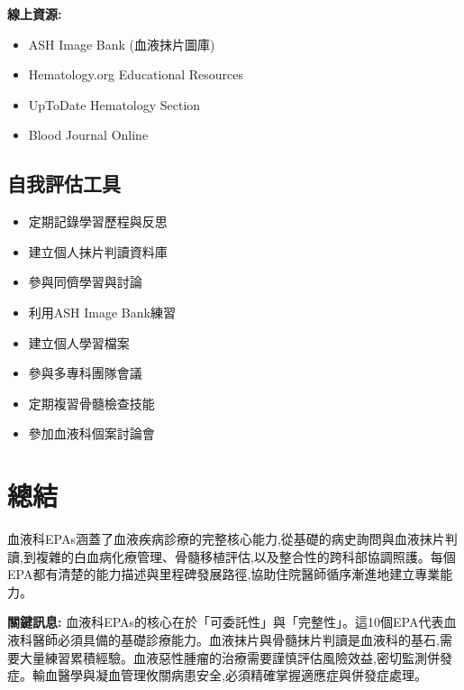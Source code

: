 \documentclass[12pt,a4paper]{article}
\begin{document}
\textbf{線上資源:}
\begin{itemize}
    \item ASH Image Bank (血液抹片圖庫)
    \item Hematology.org Educational Resources
    \item UpToDate Hematology Section
    \item Blood Journal Online
\end{itemize}

\subsection{自我評估工具}
\begin{itemize}[nosep]
    \item 定期記錄學習歷程與反思
    \item 建立個人抹片判讀資料庫
    \item 參與同儕學習與討論
    \item 利用ASH Image Bank練習
    \item 建立個人學習檔案
    \item 參與多專科團隊會議
    \item 定期複習骨髓檢查技能
    \item 參加血液科個案討論會
\end{itemize}

\section{總結}

血液科EPAs涵蓋了血液疾病診療的完整核心能力,從基礎的病史詢問與血液抹片判讀,到複雜的白血病化療管理、骨髓移植評估,以及整合性的跨科部協調照護。每個EPA都有清楚的能力描述與里程碑發展路徑,協助住院醫師循序漸進地建立專業能力。

\begin{importantbox}
\textbf{關鍵訊息:} 血液科EPAs的核心在於「可委託性」與「完整性」。這10個EPA代表血液科醫師必須具備的基礎診療能力。血液抹片與骨髓抹片判讀是血液科的基石,需要大量練習累積經驗。血液惡性腫瘤的治療需要謹慎評估風險效益,密切監測併發症。輸血醫學與凝血管理攸關病患安全,必須精確掌握適應症與併發症處理。
\end{importantbox}

\end{document}
